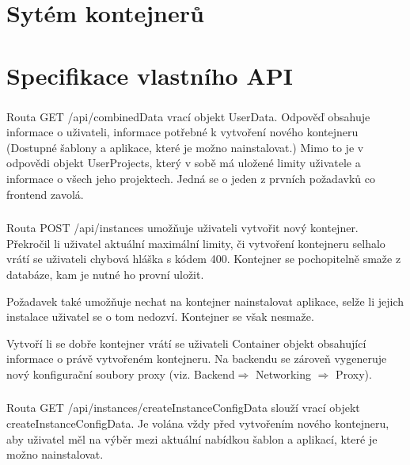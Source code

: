 \documentclass[a4paper,oneside,12pt]{report}
\begin{document}
\section{Sytém kontejnerů}


\section{Specifikace vlastního API}


\subsubsection{\color{apiblue}{GET -- /api/combinedData}}

Routa GET /api/combinedData vrací objekt UserData.
Odpověď obsahuje informace o uživateli, informace potřebné k vytvoření nového kontejneru (Dostupné šablony a aplikace, které je možno nainstalovat.)
Mimo to je v odpovědi objekt UserProjects, který v sobě má uložené limity uživatele a informace o všech jeho projektech.
Jedná se o jeden z prvních požadavků co frontend zavolá.

\subsubsection{\color{apiblue}{POST -- /api/instances}}

Routa POST /api/instances umožňuje uživateli vytvořit nový kontejner.
Překročil li uživatel aktuální maximální limity, či vytvoření kontejneru selhalo vrátí se uživateli chybová hláška s kódem 400.
Kontejner se pochopitelně smaže z databáze, kam je nutné ho provní uložit.

Požadavek také umožňuje nechat na kontejner nainstalovat aplikace, selže li jejich instalace uživatel se o tom nedozví.
Kontejner se však nesmaže.

Vytvoří li se dobře kontejner vrátí se uživateli Container objekt obsahující informace o právě vytvořeném kontejneru.
Na backendu se zároveň vygeneruje nový konfigurační soubory proxy (viz. Backend$\Rightarrow$ Networking $\Rightarrow$ Proxy).


\subsubsection{\color{apiblue}{GET -- /api/instances/createInstanceConfigData}}

Routa GET /api/instances/createInstanceConfigData slouží vrací objekt createInstanceConfigData.
Je volána vždy před vytvořením nového kontejneru, aby uživatel měl na výběr mezi aktuální nabídkou šablon a aplikací, které je možno nainstalovat.
\end{document}
